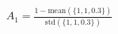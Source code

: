 \documentclass[preview]{standalone}
\begin{document}
\begin{align*}
A_1 = \frac{1 - \text{mean}\left(\{1, 1, 0.3\}\right)}{\text{std}\left(\{1, 1, 0.3\}\right)}
\end{align*}
\end{document}
